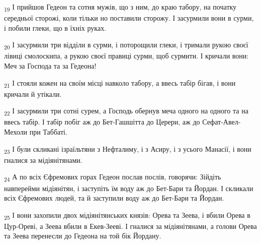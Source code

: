 \begin{tcolorbox}
\textsubscript{19} І прийшов Гедеон та сотня мужів, що з ним, до краю табору, на початку середньої сторожі, коли тільки но поставили сторожу. І засурмили вони в сурми, і побили глеки, що в їхніх руках.
\end{tcolorbox}
\begin{tcolorbox}
\textsubscript{20} І засурмили три відділи в сурми, і поторощили глеки, і тримали рукою своєї лівиці смолоскипа, а рукою своєї правиці сурми, щоб сурмити. І кричали вони: Меч за Господа та за Гедеона!
\end{tcolorbox}
\begin{tcolorbox}
\textsubscript{21} І стояли кожен на своїм місці навколо табору, а ввесь табір бігав, і вони кричали й утікали.
\end{tcolorbox}
\begin{tcolorbox}
\textsubscript{22} І засурмили три сотні сурем, а Господь обернув меча одного на одного та на ввесь табір. І табір побіг аж до Бет-Гашшітта до Церери, аж до Сефат-Авел-Мехоли при Таббаті.
\end{tcolorbox}
\begin{tcolorbox}
\textsubscript{23} І були скликані ізраїльтяни з Нефталиму, і з Асиру, і з усього Манасії, і вони гналися за мідіянітянами.
\end{tcolorbox}
\begin{tcolorbox}
\textsubscript{24} А по всіх Єфремових горах Гедеон послав послів, говорячи: Зійдіть навперейми мідіянітян, і заступіть їм воду аж до Бет-Бари та Йордан. І скликали всіх Єфремових людей, та й заступили воду аж до Бет-Бари та Йордан.
\end{tcolorbox}
\begin{tcolorbox}
\textsubscript{25} І вони захопили двох мідіянітянських князів: Орева та Зеева, і вбили Орева в Цур-Ореві, а Зеева вбили в Екев-Зееві. І гналися за мідіянітянами, а голови Орева та Зеева перенесли до Гедеона на той бік Йордану.
\end{tcolorbox}
